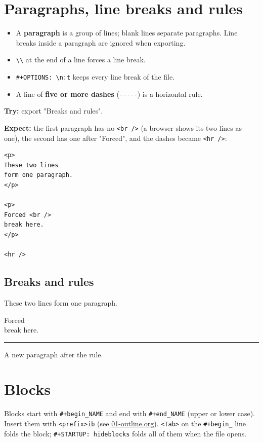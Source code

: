 \section{Paragraphs, line breaks and rules}
\label{sec:org2ee9fa0}
\begin{itemize}
\item A \textbf{paragraph} is a group of lines; blank lines separate paragraphs. Line
breaks inside a paragraph are ignored when exporting.
\item \texttt{\textbackslash{}\textbackslash{}} at the end of a line forces a line break.
\item \texttt{\#+OPTIONS: \textbackslash{}n:t} keeps every line break of the file.
\item A line of \textbf{five or more dashes} (\texttt{-{}-{}-{}-{}-}) is a horizontal rule.
\end{itemize}

\textbf{Try:} export "Breaks and rules".

\textbf{Expect:} the first paragraph has no \texttt{<br />} (a browser shows its two
lines as one), the second has one after "Forced", and the dashes became
\texttt{<hr />}:
\begin{verbatim}
<p>
These two lines
form one paragraph.
</p>

<p>
Forced <br />
break here.
</p>

<hr />
\end{verbatim}
\subsection{Breaks and rules}
\label{sec:org4f04a7e}
These two lines
form one paragraph.

Forced \\
break here.

\noindent\rule{\textwidth}{0.5pt}

A new paragraph after the rule.
\section{Blocks}
\label{sec:orgd42c180}
Blocks start with \texttt{\#+begin\_NAME} and end with \texttt{\#+end\_NAME} (upper or lower
case). Insert them with \texttt{<prefix>ib} (see
\href{01-outline.org}{01-outline.org}). \texttt{<Tab>} on the \texttt{\#+begin\_} line
folds the block; \texttt{\#+STARTUP: hideblocks} folds all of them when the file
opens.

